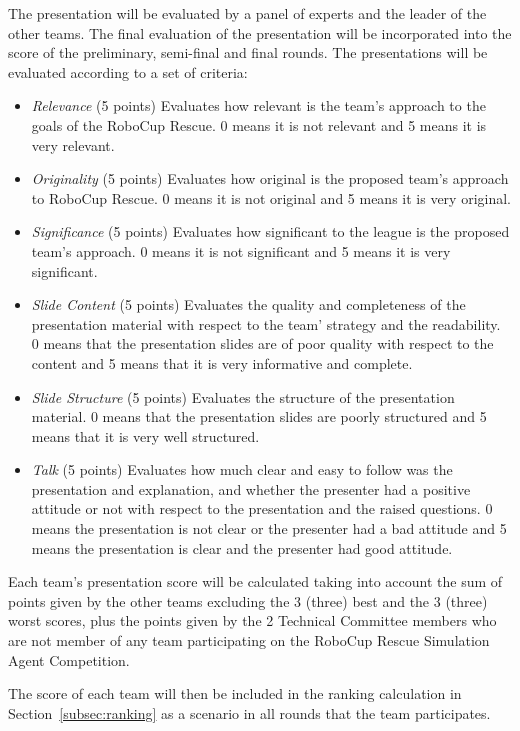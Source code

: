 \documentclass{article}
\begin{document}
The presentation will be evaluated by a panel of experts and the leader of the 
other teams. The final evaluation of the presentation will be incorporated into 
the score of the preliminary, semi-final and final rounds. The presentations
will be evaluated according to a set of criteria:
\begin{itemize}
\item \emph{Relevance} (5 points) Evaluates how relevant is the team's approach 
to the goals of the RoboCup Rescue. 0 means it is not relevant and 5 means it 
is very relevant.
\item \emph{Originality} (5 points) Evaluates how original is the proposed 
team's approach to RoboCup Rescue. 0 means it is not original and 5 means it is 
very original.
\item \emph{Significance} (5 points) Evaluates how significant to the league is 
the proposed team's approach. 0 means it is not significant and 5 means it is 
very significant.
\item \emph{Slide Content} (5 points) Evaluates the quality and completeness 
of the presentation material with respect to the team' strategy and the 
readability. 0 means that the presentation slides are of poor quality with 
respect to the content and 5 means that it is very informative and complete.
\item \emph{Slide Structure} (5 points) Evaluates the structure of the 
presentation material. 0 means that the presentation slides are poorly 
structured and 5 means that it is very well structured.
\item \emph{Talk} (5 points) Evaluates how much clear and easy to follow was 
the presentation and explanation, and whether the presenter had a positive 
attitude or not with respect to the presentation and the raised questions. 0 
means the presentation is not clear or the presenter had a bad attitude and 5
means the presentation is clear and the presenter had good attitude.
\end{itemize}

Each team's presentation score will be calculated taking into account the sum 
of points given by the other teams excluding the 3 (three) best and the 3 
(three) worst scores, plus the points given by the 2 Technical Committee members 
who are not member of any team participating on the RoboCup Rescue Simulation 
Agent Competition.

The score of each team will then be included in the ranking calculation in 
Section~\ref{subsec:ranking} as a scenario in all rounds that the team
participates.
\end{document}
